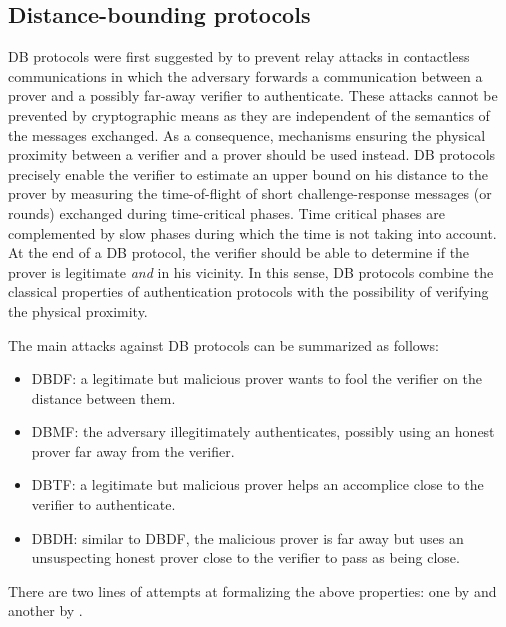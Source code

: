 \subsection{Distance-bounding protocols}%
\label{distance-bounding}

\Ac{DB} protocols were first suggested by \citet{DistanceBounding} to prevent relay attacks in contactless communications in which the adversary forwards a communication between a prover and a possibly far-away verifier to authenticate. 
These attacks cannot be prevented by cryptographic means as they are independent of the semantics of the messages exchanged.
As a consequence, mechanisms ensuring the physical proximity between a verifier and a prover should be used instead.
\Ac{DB} protocols precisely enable the verifier to estimate an upper bound on his distance to the prover by measuring the time-of-flight of short challenge-response messages (or rounds) exchanged during time-critical phases. 
Time critical phases are complemented by slow phases during which the time is not taking into account. 
At the end of a \Ac{DB} protocol, the verifier should be able to determine if the prover is legitimate \emph{and} in his vicinity.
In this sense, \Ac{DB} protocols combine the classical properties of authentication protocols with the possibility of verifying the physical proximity.

The main attacks against \ac{DB} protocols can be summarized as follows:
\begin{itemize}
  \item \Acf{DBDF}: a legitimate but malicious prover wants to fool the verifier on the distance between them.
  \item \Acf{DBMF}: the adversary illegitimately authenticates, possibly using an honest prover far away from the verifier.
  \item \Acf{DBTF}: a legitimate but malicious prover helps an accomplice close to the verifier to authenticate.
  \item \Acf{DBDH}: similar to \ac{DBDF}, the malicious prover is far away but uses an unsuspecting honest prover close to the verifier to pass as being close.
\end{itemize}
There are two lines of attempts at formalizing the above properties: one by \citet{DB-BMV} and another by \citet{DB-DFKO}.


